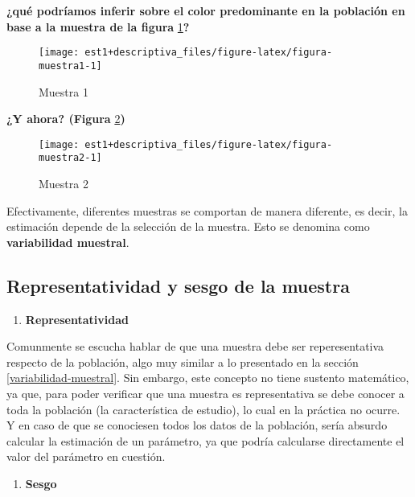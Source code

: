 \documentclass[
]{book}
\providecommand{\tightlist}{%
  \setlength{\itemsep}{0pt}\setlength{\parskip}{0pt}}
\begin{document}
\textbf{¿qué podríamos inferir sobre el color predominante en la población en base a la muestra de la figura} \ref{fig:figura-muestra1}\textbf{?}

\begin{figure}

{\centering \texttt{[image: est1+descriptiva\_files/figure-latex/figura-muestra1-1]} 

}

\caption{Muestra 1}\label{fig:figura-muestra1}
\end{figure}

\textbf{¿Y ahora? (Figura} \ref{fig:figura-muestra2}\textbf{)}

\begin{figure}

{\centering \texttt{[image: est1+descriptiva\_files/figure-latex/figura-muestra2-1]} 

}

\caption{Muestra 2}\label{fig:figura-muestra2}
\end{figure}

Efectivamente, diferentes muestras se comportan de manera diferente, es decir, la estimación depende de la selección de la muestra. Esto se denomina como \textbf{variabilidad muestral}.

\hypertarget{representatividad-y-sesgo-de-la-muestra}{%
\subsection{Representatividad y sesgo de la muestra}\label{representatividad-y-sesgo-de-la-muestra}}

\begin{enumerate}
\def\labelenumi{\arabic{enumi}.}
\tightlist
\item
  \textbf{Representatividad}
\end{enumerate}

Comunmente se escucha hablar de que una muestra debe ser reperesentativa respecto de la población, algo muy similar a lo presentado en la sección \ref{variabilidad-muestral}. Sin embargo, este concepto no tiene sustento matemático, ya que, para poder verificar que una muestra es representativa se debe conocer a toda la población (la característica de estudio), lo cual en la práctica no ocurre. Y en caso de que se conociesen todos los datos de la población, sería absurdo calcular la estimación de un parámetro, ya que podría calcularse directamente el valor del parámetro en cuestión.

\begin{enumerate}
\def\labelenumi{\arabic{enumi}.}
\setcounter{enumi}{1}
\tightlist
\item
  \textbf{Sesgo}
\end{enumerate}
\end{document}

